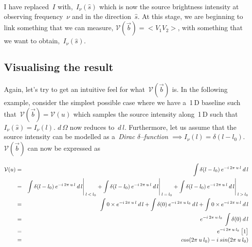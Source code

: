 I have replaced~$I$ with,~$I_\nu (\hat{s})$ which is now the source brightness intensity at observing frequency~$\nu $ and in the direction~$\hat{s}$. At this stage, we are beginning to link something that we can measure, $\mathcal{V}(\vec{b}) = <V_1V_2>$, with something that we want to obtain,~$I_\nu (\hat{s})$.


\subsection{Visualising the result}
\label{sec:visualising-result}

Again, let's try to get an intuitive feel for what~$\mathcal{V}(\vec{b})$ is. In the following example, consider the simplest possible case where we have a~1\,D baseline such that~$\mathcal{V}(\vec{b}) = \mathcal{V}(u)$ which samples the source intensity along~1\,D such that~$I_\nu (\hat{s}) = I_\nu (l)$. $d\,\Omega $ now reduces to~$d\, l$. Furthermore, let us assume that the source intensity can be modelled as a~\emph{Dirac $\delta $--function} $\implies I_\nu (l) = \delta(l - l_0)$. $\mathcal{V}(\vec{b})$ can now be expressed as

\begin{eqnarray}
  \label{eq:25}
  \mathcal{V}(u) &=& \int \delta(l - l_0) \msp e^{-i \msp 2\pi \msp u \msp l} \msp d\,l \nonumber \\
                 &=& \int \delta(l - l_0) \msp e^{-i \msp 2\pi \msp u \msp l} \msp d\,l \Bigg \rvert_{\msp l \msp < \msp l_0} + \int \delta(l - l_0) \msp e^{-i \msp 2\pi \msp u \msp l} \msp d\,l \Bigg \rvert_{\msp l \msp = \msp l_0} + \int \delta(l - l_0) \msp e^{-i \msp 2\pi \msp u \msp l} \msp d\,l \Bigg \rvert_{\msp l \msp > \msp l_0} \nonumber \\
                                   &=& \int 0 \times e^{-i \msp 2\pi \msp u \msp l} \msp d\,l + \int \delta(0) \msp e^{-i \msp 2\pi \msp u \msp l_0} \msp d\,l + \int 0 \times e^{-i \msp 2\pi \msp u \msp l} \msp d\,l \nonumber \\
                                   &=& e^{-i \msp 2\pi \msp u \msp l_0} \msp \int \delta(0) \msp d\,l \nonumber \\
                                   &=& e^{-i \msp 2\pi \msp u \msp l_0} \msp \big [1\big ] \nonumber \\
                                   &=& cos(2\pi \msp u \msp l_0) - i \msp sin(2\pi \msp u \msp l_0) \nonumber
\end{eqnarray}

